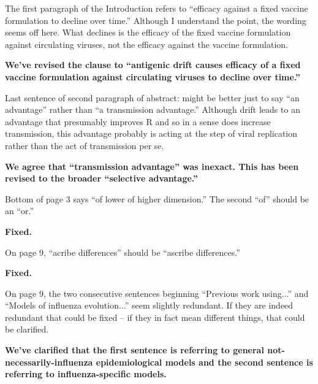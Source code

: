 \documentclass[11pt,oneside,letterpaper]{article}
\begin{document}
The first paragraph of the Introduction refers to ``efficacy against a fixed vaccine formulation to decline over time.'' Although I understand the point, the wording seems off here. What declines is the efficacy of the fixed vaccine formulation against circulating viruses, not the efficacy against the vaccine formulation. 

\textbf{We've revised the clause to ``antigenic drift causes efficacy of a fixed vaccine formulation against circulating viruses to decline over time.''}

Last sentence of second paragraph of abstract: might be better just to say ``an advantage'' rather than ``a transmission advantage.'' Although drift leads to an advantage that presumably improves R and so in a sense does increase transmission, this advantage probably is acting at the step of viral replication rather than the act of transmission per se. 

\textbf{We agree that ``transmission advantage'' was inexact.  This has been revised to the broader ``selective advantage.''}

Bottom of page 3 says ``of lower of higher dimension.'' The second ``of'' should be an ``or.'' 

\textbf{Fixed.}

On page 9, ``acribe differences'' should be ``ascribe differences.''

\textbf{Fixed.}

On page 9, the two consecutive sentences beginning ``Previous work using...'' and ``Models of influenza evolution...'' seem slightly redundant. If they are indeed redundant that could be fixed -- if they in fact mean different things, that could be clarified. 

\textbf{We've clarified that the first sentence is referring to general not-necessarily-influenza epidemiological models and the second sentence is referring to influenza-specific models.}
\end{document}
